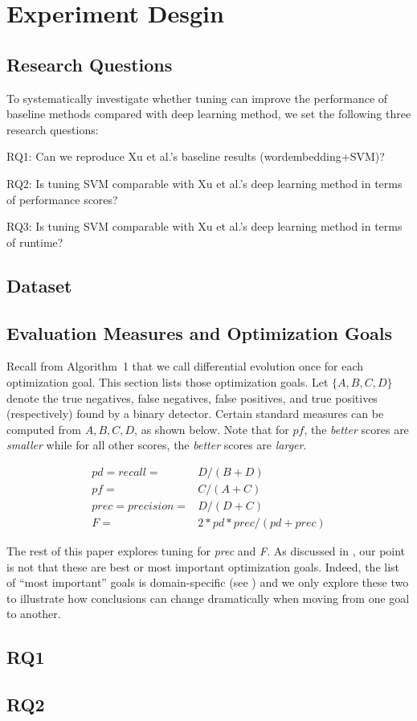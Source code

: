\section{Experiment Desgin}
\subsection{Research Questions}
 To systematically investigate whether tuning can improve the 
 performance of baseline methods compared with deep learning method, we set
 the following three research questions:
 
 \bi
 \item RQ1: Can we reproduce Xu et al.'s baseline results (wordembedding+SVM)?
 \item RQ2: Is tuning SVM comparable with Xu et al.'s deep learning method in terms of performance scores?
 \item RQ3: Is tuning SVM comparable with Xu et al.'s deep learning method in terms of runtime?
 \ei
 
 
 

 
 
 
 
 
\subsection{Dataset}
\subsection{Evaluation Measures and Optimization Goals}
Recall from Algorithm~1 that we call differential evolution once for each
 optimization goal. This section lists those optimization goals.
Let $\{A,B,C,D\}$ denote the
true negatives, 
false negatives, 
false positives, and 
true positives
(respectively) found by a binary detector. 
Certain standard measures can be computed from
$A,B,C,D$, as shown below. Note that for $pf$, the {\em better} scores are {\em smaller}
while
for all other scores, the {\em better} scores are {\em larger}.

{\scriptsize\[
\begin{array}{ll}
pd=recall=&D/(B+D)\\
pf=&C/(A+C)\\ 
prec=precision=&D/(D+C) \\
F =&2*pd*prec/(pd + prec)
\end{array}
\]}

The rest of this paper explores tuning for {\em prec} and {\em F}. As discussed
in , our point is not that these are best or most important optimization goals.
Indeed, the list of ``most important'' goals is domain-specific (see )
and we only explore these two to illustrate how conclusions can change dramatically
when moving from one goal to another.




\subsection{RQ1}
\subsection{RQ2}
